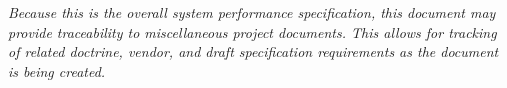 







{\em 
Because this is the overall system performance specification, this document may provide traceability to miscellaneous project documents.
This allows for tracking of related doctrine, vendor, and draft specification requirements as the document is being created.
}



